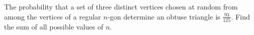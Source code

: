 The probability that a set of three distinct vertices chosen at random from among the vertices of a regular $n$-gon determine an obtuse triangle is $\tfrac{93}{125}$. Find the sum of all possible values of $n$.